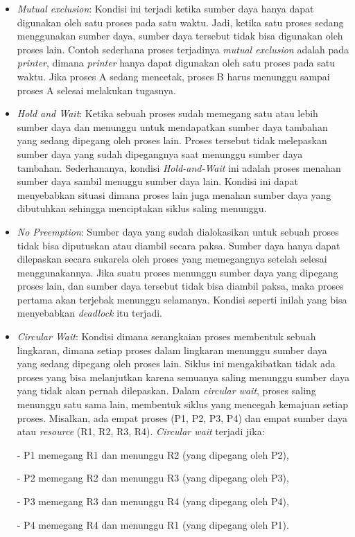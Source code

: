 \documentclass[12pt]{article}
\begin{document}
\begin{itemize}

    \item \textit{Mutual exclusion}: Kondisi ini terjadi ketika sumber daya hanya dapat digunakan oleh satu proses pada satu waktu. Jadi, ketika satu proses sedang menggunakan sumber daya, sumber daya tersebut tidak bisa digunakan oleh proses lain. Contoh sederhana proses terjadinya \textit{mutual exclusion} adalah pada \textit{printer}, dimana \textit{printer} hanya dapat digunakan oleh satu proses pada satu waktu. Jika proses A sedang mencetak, proses B harus menunggu sampai proses A selesai melakukan tugasnya.
    
    \item \textit{Hold and Wait}: Ketika sebuah proses sudah memegang satu atau lebih sumber daya dan menunggu untuk mendapatkan sumber daya tambahan yang sedang dipegang oleh proses lain. Proses tersebut tidak melepaskan sumber daya yang sudah dipegangnya saat menunggu sumber daya tambahan. Sederhananya, kondisi \textit{Hold-and-Wait} ini adalah proses menahan sumber daya sambil menuggu sumber daya lain.  Kondisi ini dapat menyebabkan situasi dimana proses lain juga menahan sumber daya yang dibutuhkan sehingga menciptakan siklus saling menunggu.
    
    \item \textit{No Preemption}:  Sumber daya yang sudah dialokasikan untuk sebuah proses tidak bisa diputuskan atau diambil secara paksa. Sumber daya hanya dapat dilepaskan secara sukarela oleh proses yang memegangnya setelah selesai menggunakannya. Jika suatu proses menunggu sumber daya yang dipegang proses lain, dan sumber daya tersebut tidak bisa diambil paksa, maka proses pertama akan terjebak menunggu selamanya. Kondisi seperti inilah yang bisa menyebabkan \textit{deadlock} itu terjadi.
    
    \item \textit{Circular Wait}:  Kondisi dimana serangkaian proses membentuk sebuah lingkaran, dimana setiap proses dalam lingkaran menunggu sumber daya yang sedang dipegang oleh proses lain. Siklus ini mengakibatkan tidak ada proses yang bisa melanjutkan karena semuanya saling menunggu sumber daya yang tidak akan pernah dilepaskan. Dalam \textit{circular wait}, proses saling menunggu satu sama lain, membentuk siklus yang mencegah kemajuan setiap proses. Misalkan, ada empat proses (P1, P2, P3, P4) dan empat sumber daya atau \textit{resource} (R1, R2, R3, R4). \textit{Circular wait} terjadi jika:

    - P1 memegang R1 dan menunggu R2 (yang dipegang oleh P2),
    
    - P2 memegang R2 dan menunggu R3 (yang dipegang oleh P3),
    
    - P3 memegang R3 dan menunggu R4 (yang dipegang oleh P4),
    
    - P4 memegang R4 dan menunggu R1 (yang dipegang oleh P1).
\end{itemize}
\begin{enumerate}

\end{enumerate}
\end{document}

